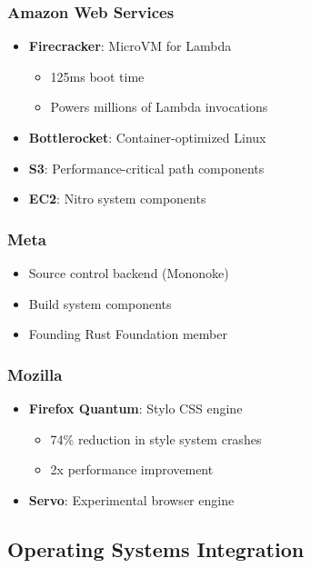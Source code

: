 \documentclass[11pt]{article}
\begin{document}
\subsubsection{Amazon Web Services}
\begin{itemize}
    \item \textbf{Firecracker}: MicroVM for Lambda
    \begin{itemize}
        \item 125ms boot time
        \item Powers millions of Lambda invocations
    \end{itemize}
    \item \textbf{Bottlerocket}: Container-optimized Linux
    \item \textbf{S3}: Performance-critical path components
    \item \textbf{EC2}: Nitro system components
\end{itemize}

\subsubsection{Meta}
\begin{itemize}
    \item Source control backend (Mononoke)
    \item Build system components
    \item Founding Rust Foundation member
\end{itemize}

\subsubsection{Mozilla}
\begin{itemize}
    \item \textbf{Firefox Quantum}: Stylo CSS engine
    \begin{itemize}
        \item 74\% reduction in style system crashes~\cite{mozilla2017quantum}
        \item 2x performance improvement
    \end{itemize}
    \item \textbf{Servo}: Experimental browser engine
\end{itemize}

\subsection{Operating Systems Integration}
\end{document}
